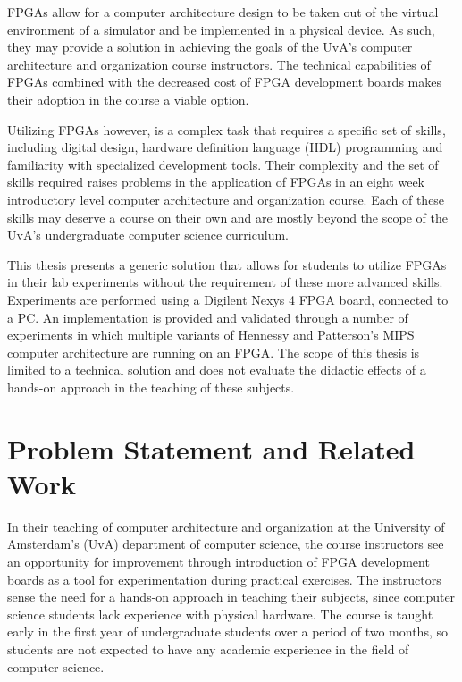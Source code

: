 \documentclass[main.tex]{subfiles}
\begin{document}
FPGAs allow for a computer architecture design to be taken out of the virtual environment of a simulator and be implemented in a physical device. As such, they may provide a solution in achieving the goals of the UvA's computer architecture and organization course instructors. The technical capabilities of FPGAs combined with the decreased cost of FPGA development boards makes their adoption in the course a viable option. 

Utilizing FPGAs however, is a complex task that requires a specific set of skills, including digital design, hardware definition language (HDL) programming and familiarity with specialized development tools. Their complexity and the set of skills required raises problems in the application of FPGAs in an eight week introductory level computer architecture and organization course. Each of these skills may deserve a course on their own and are mostly beyond the scope of the UvA's undergraduate computer science curriculum. 

This thesis presents a generic solution that allows for students to utilize FPGAs in their lab experiments without the requirement of these more advanced skills. Experiments are performed using a Digilent Nexys 4 FPGA board, connected to a PC. An implementation is provided and validated through a number of experiments in which multiple variants of Hennessy and Patterson's MIPS computer architecture are running on an FPGA. The scope of this thesis is limited to a technical solution and does not evaluate the didactic effects of a hands-on approach in the teaching of these subjects.


\section{Problem Statement and Related Work}
\label{sectionproblemstatement}


In their teaching of computer architecture and organization at the University of Amsterdam's (UvA) department of computer science, the course instructors see an opportunity for improvement through introduction of FPGA development boards as a tool for experimentation during practical exercises. The instructors sense the need for a hands-on approach in teaching their subjects, since computer science students lack experience with physical hardware. The course is taught early in the first year of undergraduate students over a period of two months, so students are not expected to have any academic experience in the field of computer science. 
\end{document}
